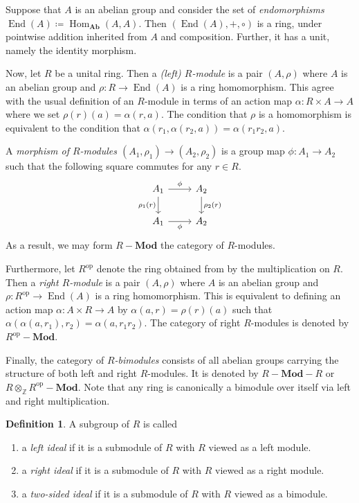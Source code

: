 \documentclass[10pt,letterpaper,cm]{nupset}
\theoremstyle{definition}
\newtheorem{definition}{Definition}[subsection]
\theoremstyle{theorem}
\theoremstyle{remark}
\newcommand{\Z}{\mathbb Z}
\newcommand{\1}{\mathbf{1}}
\newcommand{\0}{\vec 0}
\DeclareMathOperator{\op}{op}
\DeclareMathOperator{\ed}{End}
\DeclareMathOperator{\Hom}{Hom}
\begin{document}
Suppose that $A$ is an abelian group and consider the set of \textit{endomorphisms} $\ed(A) \coloneqq \Hom_{\mathbf{Ab}}(A, A)$. Then $\left(\ed(A), +, \circ\right)$ is a ring, under pointwise addition inherited from $A$ and composition. Further, it has a unit, namely the identity morphism. 

 Now,
let $R$ be a unital ring. Then a \textit{(left) $R$-module} is a pair $(A, \rho)$ where $A$ is an abelian group and $\rho : R \to \ed(A)$ is a ring homomorphism.
This agree with the usual definition of an $R$-module in terms of an action map $\alpha : R\times A \to A$ where we set $\rho(r)(a) = \alpha(r, a)$. The condition that $\rho$ is a homomorphism is equivalent to the condition that $\alpha\left(r_{1}, \alpha\left(r_{2}, a\right)\right)=\alpha\left(r_{1} r_{2}, a\right)$. 

A \textit{morphism of $R$-modules $(A_1, \rho_1) \to (A_2, \rho_2)$} is a group map $\phi : A_1 \to A_2$ such that the following square commutes for any $r\in R$.
\[
\begin{tikzcd}
A_1 \arrow[d, "\rho_1(r)"'] \arrow[r, "\phi"] & A_2 \arrow[d, "\rho_2(r)"] \\
A_1 \arrow[r, "\phi"'] & A_2
\end{tikzcd}
\] 
As a result, we may form $R{-}\mathbf{Mod}$ the category of $R$-modules.


Furthermore, let $R^{\op}$ denote the ring obtained from by the multiplication on $R$. Then a \textit{right $R$-module} is a pair $(A, \rho)$ where $A$ is an abelian group and $\rho : R^{\op} \to \ed(A)$ is a ring homomorphism. This is equivalent to defining an action map $\alpha : A \times R \to A$ by $\alpha(a, r) = \rho(r)(a)$ such that $\alpha\left(\alpha\left(a, r_{1}\right), r_{2}\right)=\alpha\left(a, r_{1} r_{2}\right)$.
 The category of right $R$-modules  is denoted by $R^{\op}{-}\mathbf{Mod}$.

Finally, the category of \textit{$R$-bimodules} consists of all abelian groups carrying the structure of both left and right $R$-modules. It is denoted by $R{-}\mathbf{Mod}{-}R$ or $R \otimes_{\Z}R^{\op}{-}\mathbf{Mod}$.
Note that any ring is canonically a bimodule over itself via left and right multiplication.

\begin{definition} A subgroup of $R$ is called
\begin{enumerate}
\item a \textit{left ideal} if it is a submodule  of $R$ with $R$ viewed as a left module.
\item a \textit{right ideal} if it is a submodule of $R$ with $R$ viewed as a right module.
\item a \textit{two-sided ideal} if it is a submodule of $R$ with $R$ viewed as a bimodule.
\end{enumerate}
\end{definition}
\end{document}
